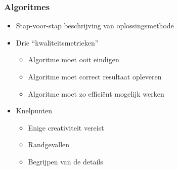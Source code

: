 \begin{frame}
  \frametitle{Algoritmes}
  \begin{itemize}
    \item Stap-voor-stap beschrijving van oplossingsmethode
          \vskip5mm
    \item Drie ``kwaliteitsmetrieken''
          \begin{itemize}
            \item Algoritme moet ooit eindigen
            \item Algoritme moet correct resultaat opleveren
            \item Algoritme moet zo effici\"ent mogelijk werken
          \end{itemize}
          \vskip5mm
    \item Knelpunten
          \begin{itemize}
            \item Enige creativiteit vereist
            \item Randgevallen
            \item Begrijpen van de details
          \end{itemize}
  \end{itemize}
\end{frame}

